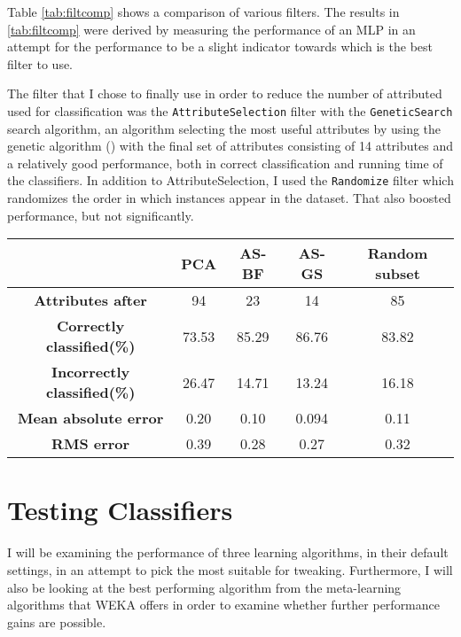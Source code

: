\documentclass[12pt,twocolumn,a4paper]{article}
\begin{document}
Table \ref{tab:filtcomp} shows a comparison of various filters. The results in \ref{tab:filtcomp} were derived by measuring the performance of an MLP in an attempt for the performance to be a slight indicator towards which is the best filter to use.

The filter that I chose to finally use in order to reduce the number of attributed used for classification was the \texttt{AttributeSelection} filter with the \texttt{GeneticSearch} search algorithm, an algorithm selecting the most useful attributes by using the genetic algorithm (\cite[p~41]{Goldberg1989}) with the final set of attributes consisting of 14 attributes and a relatively good performance, both in correct classification and running time of the classifiers. In addition to AttributeSelection, I used the \texttt{Randomize} filter which randomizes the order in which instances appear in the dataset. That also boosted performance, but not significantly.

\begin{table*}
\center
    \begin{tabular}{c | c | c | c | c }
    ~                      & \textbf{PCA}   & \textbf{AS-BF} & \textbf{AS-GS} & \textbf{Random subset}\\ \hline
    \textbf{Attributes after}       & 94    & 23    & 14    & 85 \\
    \textbf{Correctly classified(\%)}   & 73.53 & 85.29 & 86.76 & 83.82 \\
    \textbf{Incorrectly classified(\%)} & 26.47 & 14.71 & 13.24 & 16.18\\
    \textbf{Mean absolute error}    & 0.20  & 0.10  & 0.094 & 0.11 \\
    \textbf{RMS error} &  0.39 & 0.28  & 0.27  & 0.32 \\
    \end{tabular}
\caption{Filter performance of a default MLP. Comparison of PCA, AttributeSelection with the default BestFirst search algorithm, AttributeSelection with GeneticAlgorithm search and a filter selecting a random subset of the attributes.}
\label{tab:filtcomp}
\end{table*}

\section{Testing Classifiers}
I will be examining the performance of three learning algorithms, in their default settings, in an attempt to pick the most suitable for tweaking. Furthermore, I will also be looking at the best performing algorithm from the meta-learning algorithms that WEKA offers in order to examine whether further performance gains are possible.
\end{document}
